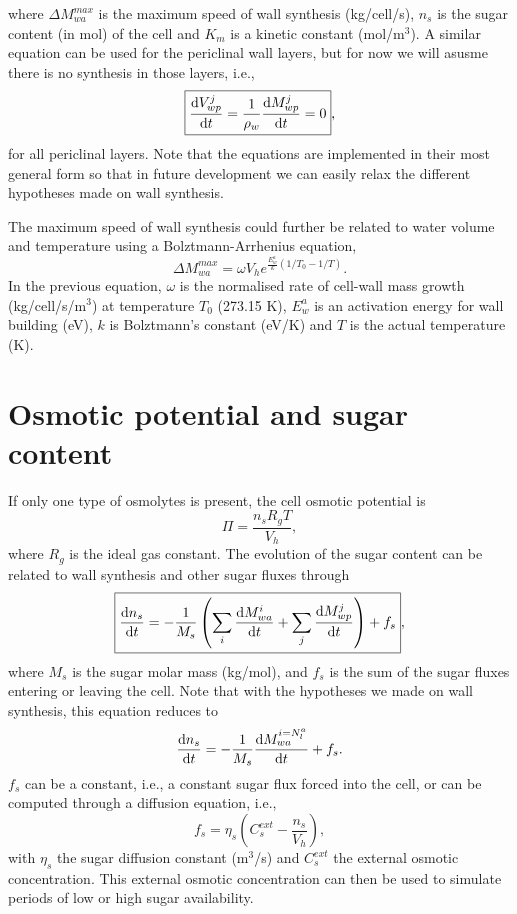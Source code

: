 \documentclass[]{article}
\begin{document}
where $\Delta M_{wa}^{max}$ is the maximum speed of wall synthesis (kg/cell/s), $n_s$ is the sugar content (in mol) of the cell and $K_m$ is a kinetic constant (mol/m$^3$). A similar equation can be used for the periclinal wall layers, but for now we will asusme there is no synthesis in those layers, i.e.,
\begin{equation}
	\boxed{
		\frac{{\rm d} V_{wp}^j}{{\rm d} t}=\frac{1}{\rho_w}\frac{{\rm d} M_{wp}^j}{{\rm d} t}=0},
\end{equation}
for all periclinal layers. Note that the equations are implemented in their most general form so that in future development we can easily relax the different hypotheses made on wall synthesis.

The maximum speed of wall synthesis could further be related to water volume and temperature using a Bolztmann-Arrhenius equation,
\begin{equation}
	\boxed{
		\Delta M_{wa}^{max}=\omega V_h e^{\frac{E^a_w}{k}(1/T_0-1/T)}}.
\end{equation}
In the previous equation, $\omega$ is the normalised rate of cell-wall mass growth (kg/cell/s/m$^3$) at temperature $T_0$ (273.15 K), $E_w^a$ is an activation energy for wall building (eV), $k$ is Bolztmann's constant (eV/K) and $T$ is the actual temperature (K).

\section{Osmotic potential and sugar content}
If only one type of osmolytes is present, the cell osmotic potential is 
\begin{equation}
	\boxed{
		\Pi = \frac{n_s R_g T}{V_h}},
\end{equation}
where $R_g$ is the ideal gas constant. The evolution of the sugar content can be related to wall synthesis and other sugar fluxes through
\begin{equation}
	\boxed{
		\frac{{\rm d} n_s}{{\rm d} t}=-\frac{1}{M_s}\left(\sum_i\frac{{\rm d} M_{wa}^i}{{\rm d} t}+\sum_j\frac{{\rm d} M_{wp}^j}{{\rm d} t}\right) + f_s},
\end{equation}
where $M_s$ is the sugar molar mass (kg/mol), and $f_s$ is the sum of the sugar fluxes entering or leaving the cell.
Note that with the hypotheses we made on wall synthesis, this equation reduces to
\begin{equation}
		\frac{{\rm d} n_s}{{\rm d} t}=-\frac{1}{M_s}\frac{{\rm d} M_{wa}^{i=N_l^a}}{{\rm d} t} + f_s.
\end{equation}
 $f_s$ can be a constant, i.e., a constant sugar flux forced into the cell, or can be computed through a diffusion equation, i.e.,
\begin{equation}
	\boxed{
		f_s = \eta_s \left(C_s^{ext} - \frac{n_s}{V_h} \right)},
\end{equation}
with $\eta_s$ the sugar diffusion constant (m$^3$/s) and $C_s^{ext}$ the external osmotic concentration. This external osmotic concentration can then be used to simulate periods of low or high sugar availability. 
\end{document}
